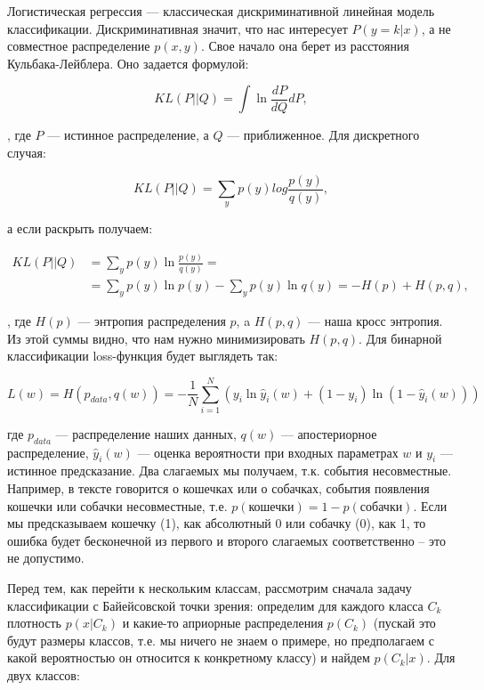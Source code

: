 Логистическая регрессия --- классическая дискриминативной линейная модель классификации. Дискриминативная
значит, что нас интересует $P (y = k | x)$, а не совместное распределение $p (x, y)$. Свое начало она берет из
расстояния Кульбака-Лейблера. Оно задается формулой:

\begin{equation}
 KL(P||Q) = \int\ln\frac{dP}{dQ}dP,
\end{equation}

, где $P$ --- истинное распределение, а $Q$ --- приближенное. Для дискретного случая:

\begin{equation}
 KL(P||Q) = \sum_{y} p(y)log\frac{p(y)}{q(y)},
\end{equation}

а если раскрыть получаем:

\begin{equation}
\begin{aligned}
 KL(P||Q) & = \sum_y p(y)\ln\frac{p(y)}{q(y)} = \\
 & = \sum_y p(y) \ln p(y) - \sum_y p(y) \ln q(y) = - H(p) + H(p,q),
\end{aligned}
\end{equation}

, где $H(p)$ ---  энтропия распределения $p$, a $H(p, q)$ --- наша кросс энтропия. Из этой суммы видно, что
нам нужно минимизировать $H(p, q)$. Для бинарной классификации loss-функция будет выглядеть так:

\begin{equation} \label{eq:logLoss}
 L(w)= H(p_{data}, q(w)) = -\frac{1}{N}\sum_{i=1}^N(y_i\ln\hat y_i(w) + (1-y_i)\ln(1-\hat y_i(w)))
\end{equation}

где $p_{data}$ --- распределение наших данных, $q(w)$ --- апостериорное распределение,  $\hat y_i(w)$ ---
оценка вероятности при входных параметрах $w$ и $y_i$ --- истинное предсказание. Два слагаемых мы получаем,
т.к. события несовместные. Например, в тексте говорится о кошечках или о собачках, события появления кошечки
или собачки несовместные, т.е. $p(\text{кошечки}) = 1 - p(\text{собачки})$. Если мы предсказываем кошечку (1),
как абсолютный 0 или собачку (0), как 1, то ошибка будет бесконечной из первого и второго слагаемых
соответственно -- это не допустимо.

Перед тем, как перейти к нескольким классам, рассмотрим сначала задачу классификации с Байейсовской точки
зрения: определим для каждого класса $C_k$ плотность $p(x|C_k)$ и какие-то априорные распределения $p(C_k)$
(пускай это будут размеры классов, т.е. мы ничего не знаем о примере, но предполагаем с какой вероятностью он
относится к конкретному классу) и найдем $p(C_k|x)$. Для двух классов:

